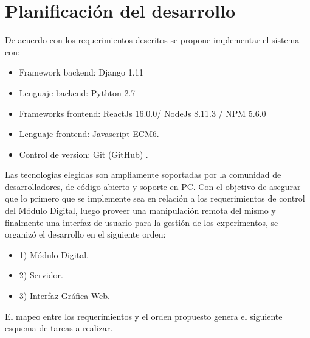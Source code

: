 \section{Planificaci\'on del desarrollo}


De acuerdo con los requerimientos descritos se propone implementar el sistema con:

\begin{itemize}
    \item Framework backend: Django 1.11
    \item Lenguaje backend: Pythton 2.7
    \item Frameworks frontend: ReactJs 16.0.0\cite{create_react_app}/ NodeJs 8.11.3 / NPM 5.6.0
    \item Lenguaje frontend: Javascript ECM6.
    \item Control de version: Git (GitHub)\cite{github} .
\end{itemize}
Las tecnolog\'ias elegidas son ampliamente soportadas por la comunidad de desarrolladores, de c\'odigo abierto y soporte en PC. Con el objetivo de asegurar que lo primero que se implemente sea en relaci\'on a los requerimientos 
de control del M\'odulo Digital, luego proveer una manipulaci\'on remota del mismo y finalmente una interfaz de
usuario para la gesti\'on de los experimentos, se organiz\'o el desarrollo en el siguiente orden:
\begin{itemize}
    \item 1) M\'odulo Digital.
    \item 2) Servidor.
    \item 3) Interfaz Gr\'afica Web.
\end{itemize}
El mapeo entre los requerimientos y el orden propuesto genera el siguiente esquema de tareas a realizar.
